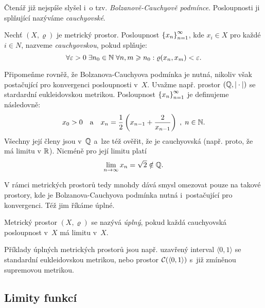 Čtenář již nejspíše slyšel i~o tzv. \emph{Bolzanově-Cauchyově podmínce}. Posloupnosti ji splňující nazýváme \emph{cauchyovské}.
\begin{definition}\label{def:cauchyovska-posloupnost}
    Nechť $(X,\varrho)$ je metrický prostor. Posloupnost $\left\{x_n\right\}_{n=1}^\infty$, kde $x_i\in X$ pro každé $i\in N$, nazveme \emph{cauchyovskou}, pokud splňuje:
    \[\forall\varepsilon>0\;\exists n_0\in\mathbb{N}\;\forall n,m\geqslant n_0:\varrho(x_n,x_m)<\varepsilon.\]
\end{definition}
Připomeňme rovněž, že Bolzanova-Cauchyova podmínka je nutná, nikoliv však postačující pro konvergenci posloupnosti v~$X$. Uvažme např. prostor $(\mathbb{Q},|\cdot|)$ se stardardní eukleidovskou metrikou. Posloupnost $\left\{x_n\right\}_{n=1}^\infty$ je definujeme následovně:
\[x_0>0\quad\text{a}\quad x_n=\dfrac{1}{2}\left(x_{n-1}+\dfrac{2}{x_{n-1}}\right)\;,\;n\in\mathbb{N}.\]
Všechny její členy jsou v~$\mathbb{Q}$ a~lze též ověřit, že je cauchyovská (např. proto, že má limitu v $\mathbb{R}$). Nicméně pro její limitu platí
\[\lim_{n\to\infty}x_n=\sqrt{2}\notin\mathbb{Q}.\]

V rámci metrických prostorů tedy mnohdy dává smysl omezovat pouze na takové prostory, kde je Bolzanova-Cauchyova podmínka nutná i~postačující pro konvergenci. Též jim říkáme úplné.
\begin{definition}\label{def:uplny-mp}
    Metrický prostor $(X,\varrho)$ se nazývá \emph{úplný}, pokud každá cauchyovská posloupnost v~$X$ má limitu v~$X$.
\end{definition}
Příklady úplných metrických prostorů jsou např. uzavřený interval $\langle0,1\rangle$ se standardní eukleidovskou metrikou, nebo prostor $\mathcal{C}(\langle0,1\rangle)$ s~již zmíněnou supremovou metrikou.

\subsection{Limity funkcí}\label{subsec:limity-fci}

